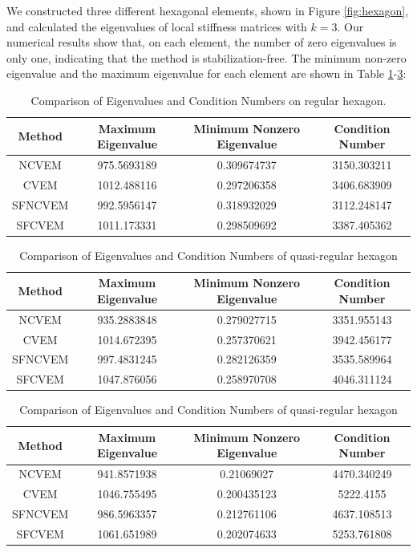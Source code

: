 \documentclass[10pt]{amsart}
\theoremstyle{definition}
\theoremstyle{remark}
\begin{document}
\begin{enumerate}[1.]
We constructed three different hexagonal elements, 
shown in Figure \ref{fig:hexagon}, and calculated the eigenvalues of local stiffness
matrices with $k=3$. Our numerical results show that, on each element, the number of zero
eigenvalues is only one, indicating that the method is stabilization-free. The
minimum non-zero eigenvalue and the maximum eigenvalue for each element are
shown in Table \ref{tab:comparison0}-\ref{tab:comparison2}:

\begin{table}[h]
\centering
\caption{Comparison of Eigenvalues and Condition Numbers on regular hexagon.}
\label{tab:comparison0}
\begin{tabular}{c|ccc}
\toprule
\textbf{Method} & \textbf{Maximum Eigenvalue} & \textbf{Minimum Nonzero
Eigenvalue} & \textbf{Condition Number} \\ \hline
NCVEM & 975.5693189 & 0.309674737 & 3150.303211 \\ \hline
CVEM & 1012.488116 & 0.297206358 & 3406.683909 \\ \hline
SFNCVEM & 992.5956147 & 0.318932029 & 3112.248147 \\ \hline
SFCVEM & 1011.173331 & 0.298509692 & 3387.405362 \\
\bottomrule
\end{tabular}
\end{table}

\begin{table}[h]
\centering
\caption{Comparison of Eigenvalues and Condition Numbers of quasi-regular hexagon}
\label{tab:comparison1}
\begin{tabular}{c|ccc}
\toprule
\textbf{Method} & \textbf{Maximum Eigenvalue} & \textbf{Minimum Nonzero
Eigenvalue} & \textbf{Condition Number} \\ \hline
NCVEM   & 935.2883848 & 0.279027715 & 3351.955143 \\ \hline
CVEM    & 1014.672395 & 0.257370621 & 3942.456177 \\ \hline
SFNCVEM & 997.4831245 & 0.282126359 & 3535.589964 \\ \hline
SFCVEM  & 1047.876056 & 0.258970708 &
4046.311124 \\
\bottomrule
\end{tabular}
\end{table}

\begin{table}[h]
\centering
\caption{Comparison of Eigenvalues and Condition Numbers of quasi-regular hexagon}
\label{tab:comparison2}
\begin{tabular}{c|ccc}
\toprule
\textbf{Method} & \textbf{Maximum Eigenvalue} & \textbf{Minimum Nonzero
Eigenvalue} & \textbf{Condition Number} \\ \hline
 NCVEM   & 941.8571938&	0.21069027	&4470.340249 \\ \hline
 CVEM    & 1046.755495&	0.200435123	&5222.4155 \\ \hline
 SFNCVEM & 986.5963357&	0.212761106	&4637.108513 \\ \hline
 SFCVEM  & 1061.651989&	0.202074633	&5253.761808 \\
\bottomrule
\end{tabular}
\end{table}



\end{enumerate}
\end{document}
